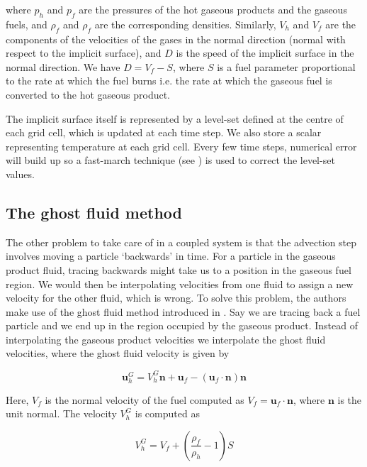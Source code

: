 \documentclass[12pt]{report}
\begin{document}
where $p_h$ and $p_f$ are the pressures of the hot gaseous products and the gaseous fuels, and $\rho_f$ and $\rho_f$ are the corresponding densities. Similarly, $V_h$ and $V_f$ are the components of the velocities of the gases in the normal direction (normal with respect to the implicit surface), and $D$ is the speed of the implicit surface in the normal direction. We have $D = V_f - S$, where $S$ is a fuel parameter proportional to the rate at which the fuel burns i.e. the rate at which the gaseous fuel is converted to the hot gaseous product.

The implicit surface itself is represented by a level-set defined at the centre of each grid cell, which is updated at each time step. We also store a scalar representing temperature at each grid cell. Every few time steps, numerical error will build up so a fast-march technique (see \cite{sethian}) is used to correct the level-set values.

\subsection{The ghost fluid method}

The other problem to take care of in a coupled system is that the advection step involves moving a particle `backwards' in time. For a particle in the gaseous product fluid, tracing backwards might take us to a position in the gaseous fuel region. We would then be interpolating velocities from one fluid to assign a new velocity for the other fluid, which is wrong. To solve this problem, the authors make use of the ghost fluid method introduced in \cite{ghost}. Say we are tracing back a fuel particle and we end up in the region occupied by the gaseous product. Instead of interpolating the gaseous product velocities we interpolate the ghost fluid velocities, where the ghost fluid velocity is given by

\begin{equation}
\mathbf{u}^G_h = V^G_h\mathbf{n} + \mathbf{u}_f - (\mathbf{u}_f\cdot\mathbf{n})\mathbf{n}
\end{equation}

Here, $V_f$ is the normal velocity of the fuel computed as $V_f = \mathbf{u}_f\cdot\mathbf{n}$, where $\mathbf{n}$ is the unit normal. The velocity $V^G_h$ is computed as

\begin{equation}
V^G_h = V_f + (\dfrac{\rho_f}{\rho_h} - 1)S
\end{equation}
\end{document}
